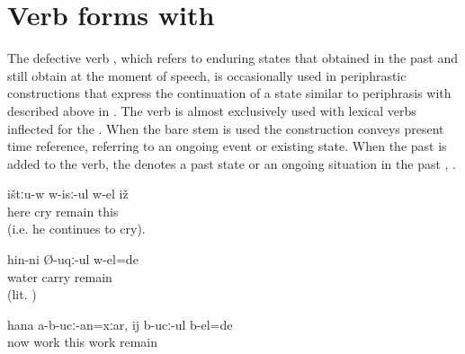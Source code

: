 \begin{exe}
\end{exe}





\section{Verb forms with \protect{} \protect{}}
\label{sec:Verb forms with b-el remain, stay}

The defective verb  , which refers to enduring states that obtained in the past and still obtain at the moment of speech, is occasionally used in periphrastic constructions that express the continuation of a state similar to periphrasis with  described above in . The verb  is almost exclusively used with lexical verbs inflected for the . When the bare stem  is used the construction conveys present time reference, referring to an ongoing event  or existing state. When the past  is added to the verb, the  denotes a past state or an ongoing situation in the past , .
%
\begin{exe}
	\ex	\label{ex:Here he is crying (i.e. he continues to cry).}
	\gll	ištːu-w	w-isː-ul	w-el	iž\\
		here	cry	remain	this\\
	\glt	{} (i.e. he continues to cry).

	\ex	\label{ex:‎‎‎He was taken away by the water}
	\gll	hin-ni	Ø-uqː-ul	w-el=de\\
		water	carry	remain\\
	\glt	{} (lit. )

	\ex	\label{ex:‎‎Even though now (my hand) does not work, (at that time) it worked}
	\gll	hana	a-b-ucː-an=xːar,	ij	b-ucː-ul	b-el=de\\
		now	work	this	work	remain\\
	\glt	{}
	
\end{exe}

